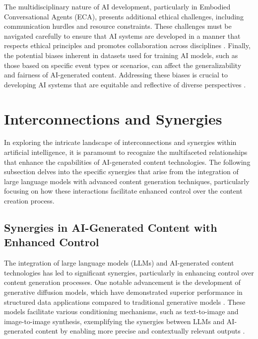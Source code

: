 The multidisciplinary nature of AI development, particularly in Embodied Conversational Agents (ECA), presents additional ethical challenges, including communication hurdles and resource constraints. These challenges must be navigated carefully to ensure that AI systems are developed in a manner that respects ethical principles and promotes collaboration across disciplines \cite{korre2023takesvillagemultidisciplinaritycollaboration}. Finally, the potential biases inherent in datasets used for training AI models, such as those based on specific event types or scenarios, can affect the generalizability and fairness of AI-generated content. Addressing these biases is crucial to developing AI systems that are equitable and reflective of diverse perspectives .









\section{Interconnections and Synergies} \label{sec:Interconnections and Synergies}

In exploring the intricate landscape of interconnections and synergies within artificial intelligence, it is paramount to recognize the multifaceted relationships that enhance the capabilities of AI-generated content technologies. The following subsection delves into the specific synergies that arise from the integration of large language models with advanced content generation techniques, particularly focusing on how these interactions facilitate enhanced control over the content creation process.





\subsection{Synergies in AI-Generated Content with Enhanced Control} \label{subsec:Synergies in AI-Generated Content with Enhanced Control}



The integration of large language models (LLMs) and AI-generated content technologies has led to significant synergies, particularly in enhancing control over content generation processes. One notable advancement is the development of generative diffusion models, which have demonstrated superior performance in structured data applications compared to traditional generative models \cite{koo2023comprehensivesurveygenerativediffusion}. These models facilitate various conditioning mechanisms, such as text-to-image and image-to-image synthesis, exemplifying the synergies between LLMs and AI-generated content by enabling more precise and contextually relevant outputs \cite{rombach2022high}.



